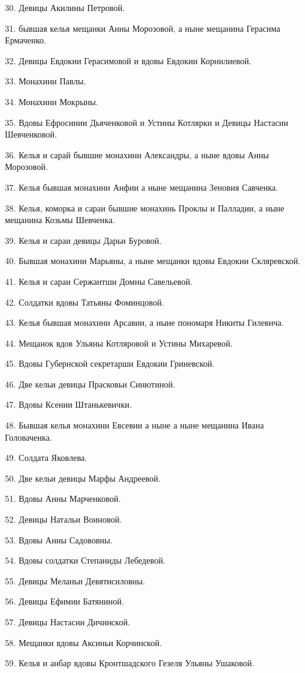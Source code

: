 30. Девицы Акилины Петровой.

31. бывшая келья мещанки Анны Морозовой, а ныне мещанина Герасима Ермаченко.

32. Девицы Евдокии Герасимовой и вдовы Евдокии Корнилиевой.

33. Монахини Павлы.

34. Монахини Мокрыны.

35. Вдовы Ефросинии Дьяченковой и Устины Котлярки и Девицы Настасии Шевченковой.

36. Келья и сарай бывшие монахини Александры, а ныне вдовы Анны Морозовой.

37. Келья бывшая монахини Анфии а ныне мещанина Зеновия Савченка.

38. Келья, коморка и сараи бывшие монахинь Проклы и Палладии, а ныне мещанина Козьмы Шевченка.

39. Келья и сараи девицы Дарьи Буровой.

40. Бывшая монахини Марьяны, а ныне мещанки вдовы Евдокии Скляревской.

41. Келья и сараи Сержантши Домны Савельевой.

42. Солдатки вдовы Татьяны Фоминцовой.

43. Келья бывшая монахини Арсавии, а ныне пономаря Никиты Гилевича.

44. Мещанок вдов Ульяны Котляровой и Устины Михаревой.

45. Вдовы Губернской секретарши Евдокии Гриневской.

46. Две кельи девицы Прасковьи Синютиной.

47. Вдовы Ксении Штанькевички.

48. Бывшая келья монахини Евсевии а ныне а ныне мещанина Ивана Головаченка.

49. Солдата Яковлева.

50. Две кельи девицы Марфы Андреевой.

51. Вдовы Анны Марченковой.

52. Девицы Натальи Воиновой.

53. Вдовы Анны Садововны.

54. Вдовы солдатки Степаниды Лебедевой.

55. Девицы Меланьи Девятисиловны.

56. Девицы Ефимии Батяниной.

57. Девицы Настасии Дичинской.

58. Мещанки вдовы Аксиньи Корчинской.

59. Келья и анбар вдовы Кронтшадского Гезеля Ульяны Ушаковой.

